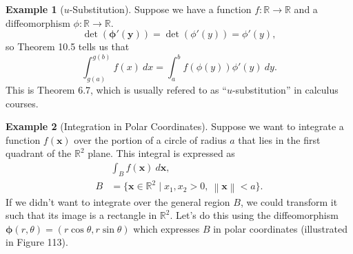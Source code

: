 \documentclass{article}
\newcommand{\R}{\mathbb{R}}
\newcommand{\x}{\mathbf{x}}
\newcommand{\y}{\mathbf{y}}
\newcommand{\norm}[1]{\left\lVert#1\right\rVert}
\theoremstyle{definition}
\newtheorem{example}{Example}[section]
\begin{document}
	\begin{example}[$u$-Substitution]
		Suppose we have a function $f:\R\to\R$ and a diffeomorphism $\phi:\R\to \R.$
		$$ \det(\boldsymbol{\phi} '(\y)) = \det(\phi'(y)) = \phi'(y) ,$$ so Theorem 10.5 tells us that 
		$$ \int_{g(a)}^{g(b)} f(x)\ dx = \int_a^bf(\phi(y))\phi'(y)\ dy.$$ This is Theorem 6.7, which is usually refered to as ``$u$-substitution'' in calculus courses. 
	\end{example}
	
	\begin{example}[Integration in Polar Coordinates]
		Suppose we want to integrate a function $f(\x)$ over the portion of a circle of radius $a$ that lies in the first quadrant of the $\R^2$ plane. This integral is expressed as
		\begin{align*}
		&\int_B f(\x)\ d\x,\\
		B &= \{\x \in \R^2\mid x_1,x_2 > 0,\ \norm{\x} < a\}.
		\end{align*}
		If we didn't want to integrate over the general region $B$, we could transform it such that its image is a rectangle in $\R^2$. Let's do this using the diffeomorphism $\boldsymbol{\phi}(r,\theta) = (r\cos \theta, r \sin\theta)$ which expresses $B$ in polar coordinates (illustrated in Figure 113).
		\begin{figure}[h!]
			\centering
			\caption{}
		\end{figure}

\end{example}
\end{document}
